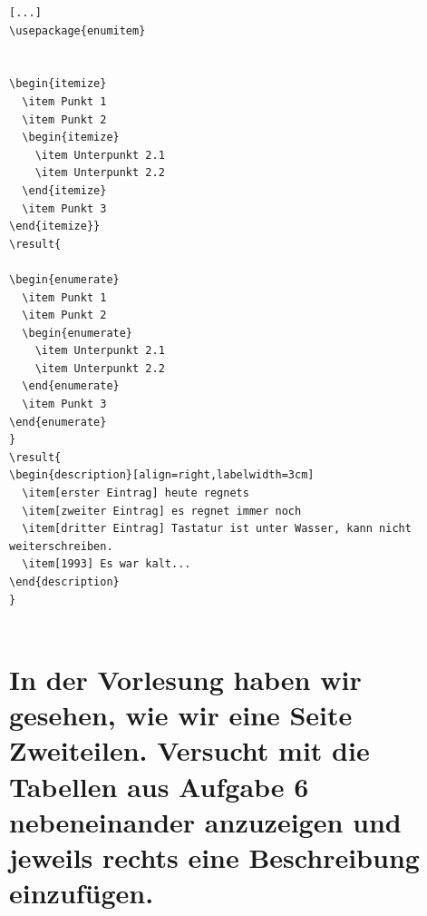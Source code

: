 \begin{Antwort}
\begin{lstlisting}[style=latex]
[...]
\usepackage{enumitem}


\begin{itemize}
  \item Punkt 1
  \item Punkt 2
  \begin{itemize}
    \item Unterpunkt 2.1
    \item Unterpunkt 2.2
  \end{itemize}
  \item Punkt 3
\end{itemize}}
\result{

\begin{enumerate}
  \item Punkt 1
  \item Punkt 2
  \begin{enumerate}
    \item Unterpunkt 2.1
    \item Unterpunkt 2.2
  \end{enumerate}
  \item Punkt 3
\end{enumerate}
}
\result{
\begin{description}[align=right,labelwidth=3cm]
  \item[erster Eintrag] heute regnets
  \item[zweiter Eintrag] es regnet immer noch
  \item[dritter Eintrag] Tastatur ist unter Wasser, kann nicht weiterschreiben.
  \item[1993] Es war kalt...
\end{description}
}


\end{lstlisting}

\end{Antwort}



\newpage 
\section{In der Vorlesung haben wir gesehen, wie wir eine Seite Zweiteilen. Versucht mit  die Tabellen aus Aufgabe 6 nebeneinander anzuzeigen und jeweils rechts eine Beschreibung einzufügen.}

